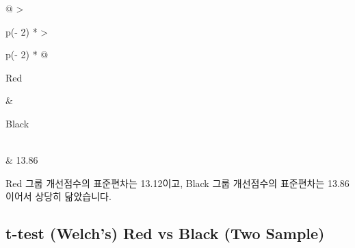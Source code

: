 \documentclass[
]{book}
\begin{document}
\begin{longtable}[]{@{}
  >{\raggedright\arraybackslash}p{(\columnwidth - 2\tabcolsep) * }
  >{\raggedright\arraybackslash}p{(\columnwidth - 2\tabcolsep) * }@{}}
\toprule\noalign{}
\begin{minipage}[b]{\linewidth}\raggedright
Red
\end{minipage} & \begin{minipage}[b]{\linewidth}\raggedright
Black
\end{minipage} \\
\midrule\noalign{}
\endhead
\bottomrule\noalign{}
 & 13.86 \\
\end{longtable}

Red 그룹 개선점수의 표준편차는 13.12이고, Black 그룹 개선점수의 표준편차는 13.86이어서 상당히 닮았습니다.

\subsection{t-test (Welch's) Red vs Black (Two Sample)}\label{t-test-welchs-red-vs-black-two-sample}
\end{document}

